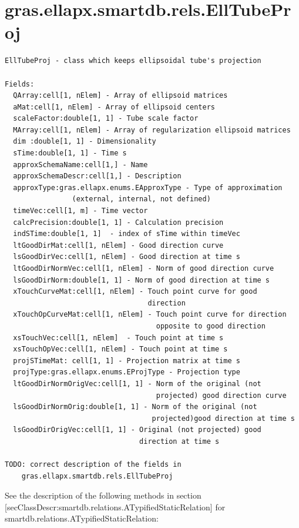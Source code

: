 \documentclass[letterpaper,10pt,english]{sphinxmanual}
\begin{document}
\section{gras.ellapx.smartdb.rels.EllTubeProj}
\label{chap_func:gras-ellapx-smartdb-rels-elltubeproj}
\begin{Verbatim}[commandchars=\\\{\}]
EllTubeProj - class which keeps ellipsoidal tube's projection

Fields:
  QArray:cell[1, nElem] - Array of ellipsoid matrices
  aMat:cell[1, nElem] - Array of ellipsoid centers
  scaleFactor:double[1, 1] - Tube scale factor
  MArray:cell[1, nElem] - Array of regularization ellipsoid matrices
  dim :double[1, 1] - Dimensionality
  sTime:double[1, 1] - Time s
  approxSchemaName:cell[1,] - Name
  approxSchemaDescr:cell[1,] - Description
  approxType:gras.ellapx.enums.EApproxType - Type of approximation
                (external, internal, not defined)
  timeVec:cell[1, m] - Time vector
  calcPrecision:double[1, 1] - Calculation precision
  indSTime:double[1, 1]  - index of sTime within timeVec
  ltGoodDirMat:cell[1, nElem] - Good direction curve
  lsGoodDirVec:cell[1, nElem] - Good direction at time s
  ltGoodDirNormVec:cell[1, nElem] - Norm of good direction curve
  lsGoodDirNorm:double[1, 1] - Norm of good direction at time s
  xTouchCurveMat:cell[1, nElem] - Touch point curve for good
                                  direction
  xTouchOpCurveMat:cell[1, nElem] - Touch point curve for direction
                                    opposite to good direction
  xsTouchVec:cell[1, nElem]  - Touch point at time s
  xsTouchOpVec:cell[1, nElem] - Touch point at time s
  projSTimeMat: cell[1, 1] - Projection matrix at time s
  projType:gras.ellapx.enums.EProjType - Projection type
  ltGoodDirNormOrigVec:cell[1, 1] - Norm of the original (not
                                    projected) good direction curve
  lsGoodDirNormOrig:double[1, 1] - Norm of the original (not
                                   projected)good direction at time s
  lsGoodDirOrigVec:cell[1, 1] - Original (not projected) good
                                direction at time s

TODO: correct description of the fields in
    gras.ellapx.smartdb.rels.EllTubeProj
\end{Verbatim}

See the description of the following methods in section
{[}secClassDescr:smartdb.relations.ATypifiedStaticRelation{]} for
smartdb.relations.ATypifiedStaticRelation:
\end{document}
